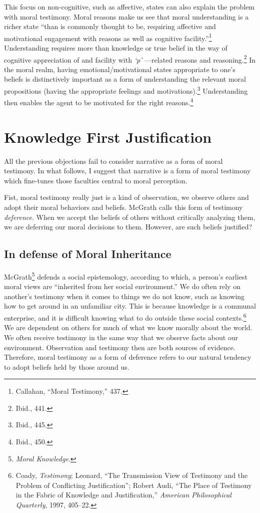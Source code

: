 \documentclass[phdthesis,12pt,final,a4paper]{wuthesis}
\theoremstyle{definition}
\theoremstyle{definition}
\theoremstyle{definition}
\theoremstyle{definition}
\theoremstyle{remark}
\begin{document}
This focus on non-cognitive, such as affective, states can also explain the problem with moral testimony. Moral reasons make us see that moral understanding is a richer state ``than is commonly thought to be, requiring affective and motivational engagement with reasons as well as cognitive facility.''\footnote{Callahan, {``Moral {Testimony},''} 437.} Understanding requires more than knowledge or true belief in the way of cognitive appreciation of and facility with \emph{`p'} ---related reasons and reasoning.\footnote{Ibid., 441.} In the moral realm, having emotional/motivational states appropriate to one's beliefs is distinctively important as a form of understanding the relevant moral propositions (having the appropriate feelings and motivations).\footnote{Ibid., 445.} Understanding then enables the agent to be motivated for the right reasons.\footnote{Ibid., 450.}

\section{Knowledge First Justification}\label{knowledge-first-justification-1}

All the previous objections fail to consider narrative as a form of moral testimony. In what follows, I suggest that narrative is a form of moral testimony which fine-tunes those faculties central to moral perception.

Fist, moral testimony really just is a kind of observation, we observe others and adopt their moral behaviors and beliefs. McGrath calls this form of testimony \emph{deference}. When we accept the beliefs of others without critically analyzing them, we are deferring our moral decisions to them. However, are such beliefs justified?

\subsection*{In defense of Moral Inheritance}\label{in-defense-of-moral-inheritance-1}

McGrath\footnote{\emph{Moral {Knowledge}}.} defends a social epistemology, according to which, a person's earliest moral views are ``inherited from her social environment.'' We do often rely on another's testimony when it comes to things we do not know, such as knowing how to get around in an unfamiliar city. This is because knowledge is a communal enterprise, and it is difficult knowing what to do outside these social contexts.\footnote{Coady, \emph{Testimony}; Leonard, {``The {Transmission View} of {Testimony} and the {Problem} of {Conflicting Justification}''}; Robert Audi, {``The {Place} of {Testimony} in the {Fabric} of {Knowledge} and {Justification},''} \emph{American Philosophical Quarterly}, 1997, 405--22.} We are dependent on others for much of what we know morally about the world. We often receive testimony in the same way that we observe facts about our environment. Observation and testimony then are both sources of evidence. Therefore, moral testimony as a form of deference refers to our natural tendency to adopt beliefs held by those around us.
\end{document}
